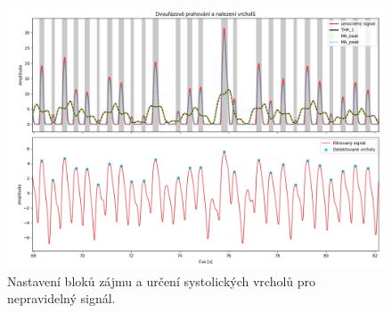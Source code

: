 \begin{figure}[b]
	\centering
	\vspace{-10mm}
	\includegraphics[width=1\textwidth]{./obrazky/Elgendi_THR_Peaks.png}
	\caption[Elgendiho zpracování nepravidelného signálu]{Nastavení bloků zájmu a určení systolických vrcholů pro nepravidelný signál.}
	\vspace{-15mm}
	\label{fig:thresholds_peaks}
\end{figure}